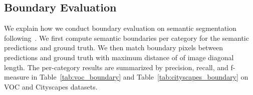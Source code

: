 \documentclass[10pt,twocolumn,letterpaper]{article}
\begin{document}
\begin{table}[h]
  \vspace{-8pt}
  \centering
\caption{Ablation study on runtime (ms) and GPU memory (MiB).}
    \vspace{-9pt}
    \label{tab:inference_ablation}
\end{table}


\subsection{Boundary Evaluation}

We explain how we conduct boundary evaluation on semantic segmentation following~\cite{arbelaez2011contour, aaf2018}. We first compute semantic boundaries per category for the semantic predictions and ground truth. We then match boundary pixels between predictions and ground truth with maximum distance of  of image diagonal length. The per-category results are summarized by precision, recall, and f-measure in Table~\ref{tab:voc_boundary} and Table~\ref{tab:cityscapes_boundary} on VOC and Cityscapes datasets.
\end{document}
